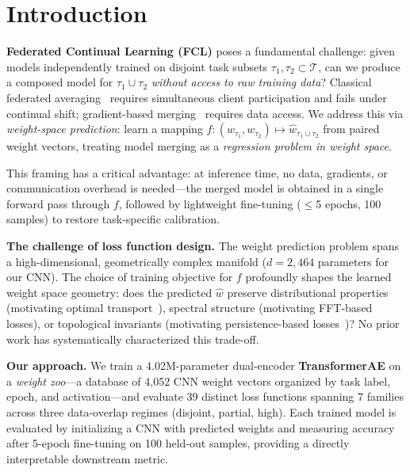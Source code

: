 \section{Introduction}
\label{sec:intro}

\textbf{Federated Continual Learning (FCL)} poses a fundamental challenge: given models independently trained on disjoint task subsets $\tau_1, \tau_2 \subset \mathcal{T}$, can we produce a composed model for $\tau_1 \cup \tau_2$ \emph{without access to raw training data}? Classical federated averaging~\cite{mcmahanCommunicationEfficientLearningDeep2017} requires simultaneous client participation and fails under continual shift; gradient-based merging~\cite{kirkpatrickOvercomingCatastrophicForgetting2017} requires data access. We address this via \emph{weight-space prediction}: learn a mapping $f: (w_{\tau_1}, w_{\tau_2}) \mapsto \hat{w}_{\tau_1 \cup \tau_2}$ from paired weight vectors, treating model merging as a \emph{regression problem in weight space}.

This framing has a critical advantage: at inference time, no data, gradients, or communication overhead is needed---the merged model is obtained in a single forward pass through $f$, followed by lightweight fine-tuning ($\leq$5 epochs, 100 samples) to restore task-specific calibration.

\textbf{The challenge of loss function design.} The weight prediction problem spans a high-dimensional, geometrically complex manifold ($d = 2{,}464$ parameters for our CNN). The choice of training objective for $f$ profoundly shapes the learned weight space geometry: does the predicted $\hat{w}$ preserve distributional properties (motivating optimal transport~\cite{villaniOptimalTransportOld2009}), spectral structure (motivating FFT-based losses), or topological invariants (motivating persistence-based losses~\cite{hoferDeepLearningTopological2019})? No prior work has systematically characterized this trade-off.

\textbf{Our approach.} We train a 4.02M-parameter dual-encoder \textbf{TransformerAE} on a \emph{weight zoo}---a database of 4,052 CNN weight vectors organized by task label, epoch, and activation---and evaluate 39 distinct loss functions spanning 7 families across three data-overlap regimes (disjoint, partial, high). Each trained model is evaluated by initializing a CNN with predicted weights and measuring accuracy after 5-epoch fine-tuning on 100 held-out samples, providing a directly interpretable downstream metric.


